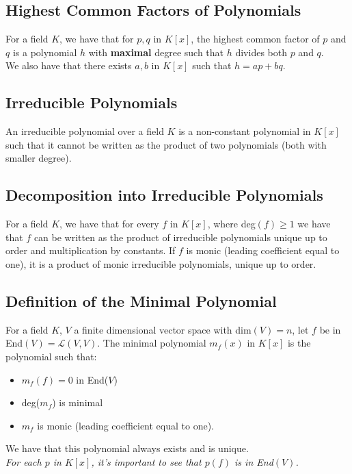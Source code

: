 \documentclass[a4paper, 12pt, twoside]{article}
\begin{document}
\subsection{Highest Common Factors of Polynomials}

For a field $K$, we have that for $p, q$ in $K[x]$, the highest common factor of $p$ and $q$
is a polynomial $h$ with \textbf{maximal} degree such that $h$ divides both $p$ and $q$.
\\[\baselineskip]
We also have that there exists $a, b$ in $K[x]$ such that $h = ap + bq$.

\subsection{Irreducible Polynomials}

An irreducible polynomial over a field $K$ is a non-constant polynomial in $K[x]$ such that
it cannot be written as the product of two polynomials (both with smaller degree).

\subsection{Decomposition into Irreducible Polynomials}

For a field $K$, we have that for every $f$ in $K[x]$, where deg$(f) \geq 1$ we have that 
$f$ can be written as the product of irreducible polynomials unique up to order and
multiplication by constants. If $f$ is monic (leading coefficient equal to one), 
it is a product of monic irreducible polynomials, unique up to order.

\subsection{Definition of the Minimal Polynomial}

For a field $K$, $V$ a finite dimensional vector space with dim$(V) = n$, let $f$ be in
End$(V) = \mathcal{L}(V, V)$. The minimal polynomial $m_f(x)$ in $K[x]$ is the polynomial
such that: \begin{itemize}
  \item $m_f(f) = 0$ in End($V$)
  \item deg($m_f$) is minimal
  \item $m_f$ is monic (leading coefficient equal to one).
\end{itemize} We have that this polynomial always exists and is unique.
\\[\baselineskip]
\textit{For each $p$ in $K[x]$, it's important to see that
$p(f)$ is in End$(V)$.}
\end{document}
